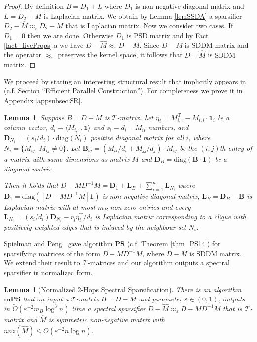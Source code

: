 \documentclass[11pt]{article}
\newcommand{\SDDM}{\mathrm{SDDM}}
\newcommand{\GL}{\mathcal{T}}
\newcommand{\mPS}{\mathrm{\mathbf{mPS}}}
\newcommand{\PS}{\mathbf{PS}}
\newcommand{\wO}{\widetilde{O}}
\newcommand{\hM}{\widehat{M}}
\newcommand{\Di}{D^{-1}}
\newcommand{\mD}{\mathbf{D}}
\newcommand{\mL}{\mathbf{L}}
\newcommand{\mB}{\mathbf{B}}
\newcommand{\diag}{\mathrm{diag}}
\newcommand{\rot}{\mathrm{T}}
\newcommand{\eps}{\epsilon}
\renewcommand{\leq}{\leqslant}
\renewcommand{\eps}{\varepsilon}
\newcommand{\mylemma}[2]{\begin{lem}\label{lem:#1}#2\end{lem}}
\newtheorem{lem}[thm]{Lemma}
\numberwithin{thm}{section}
\begin{document}
\begin{proof}
By definition $B=D_{1}+L$ where $D_{1}$ is non-negative diagonal matrix and $L=D_{2}-M$ is Laplacian matrix. We obtain by Lemma \ref{lemSSDA} a sparsifier $D_{2}-\hM\approx_{\eps}D_{2}-M$ that is Laplacian matrix. Now we consider two cases. If $D_1=0$ then we are done. Otherwise $D_1$ is PSD matrix and by Fact \ref{fact_fiveProps}.a we have $D-\hM\approx_{\eps}D-M$. Since $D-M$ is $\SDDM$ matrix and the operator $\approx_{\eps}$ preserves the kernel space, it follows that $D-\hM$ is $\SDDM$ matrix.
\end{proof}


We proceed by stating an interesting structural result that implicitly appears in~\cite{PS14} (c.f. Section ``Efficient
Parallel Construction''). For completeness we prove it in Appendix \ref{appsubsec:SR}.


\newcommand{\lemGLStruct}
{
Suppose $B=D-M$ is $\GL$-matrix. Let
$\eta_{i}=M_{i,:}^{\rot}-M_{i,i}\cdot\mathbf{1}_{i}$ be a column vector,
$d_{i}=\langle M_{i,:},\mathbf{1}\rangle $ and $s_{i}=d_{i}-M_{ii}$
numbers, and $\mD_{N_i}=(s_{i}/d_{i})\cdot\diag(N_i)$
positive diagonal matrix for all $i$, where $N_i=\{ M_{ij}\,|\, M_{ij}\neq0\}$. Let $\mB_{ij}=(M_{ii}/d_{i}+M_{jj}/d_{j})\cdot M_{ij}$ be the $(i,j)$th entry of a matrix with same dimensions as matrix $M$ and $\mD_{B}=\mathrm{diag(\mB\cdot\mathbf{1})}$ be a diagonal matrix.

Then it holds that
$D-M\Di M = \mD_{1}+\mL_{B}+{\sum}_{i=1}^{n}\mL_{N_i}$ where $\mD_{1}=\diag([D-M\Di M]\mathbf{1})$ is non-negative diagonal matrix, $\mL_{B}=\mD_{B}-\mB$ is Laplacian matrix with
at most $m_B$ non-zero entries and every $\mL_{N_i}=(s_{i}/d_{i})\mD_{N_i}-\eta_{i}\eta_{i}^{\rot}/d_{i}$ is Laplacian matrix corresponding to a clique with positively weighted edges that is induced by the neighbour set $N_i$.
}
\mylemma{lemGLStruct}{\lemGLStruct}


Spielman and Peng~\cite{PS14} gave algorithm $\PS$ (c.f. Theorem \ref{thm_PS14}) for sparsifying matrices of the form $D-M\Di M$, where $D-M$ is $\SDDM$ matrix. We extend their result to $\GL$-matrices and our algorithm outputs a spectral sparsifier in normalized form.

\begin{lem}[Normalized 2-Hops Spectral Sparsification]\label{lemmPS}
There is an algorithm $\mPS$ that on input a $\GL$-matrix $B=D-M$ and parameter $\eps\in(0,1)$, outputs in $\wO(\eps^{-2}m_{B}\log^{3}n)$ time a spectral sparsifier $D-\hM \approx_{\eps}D-M\Di M$ that is $\GL$-matrix and $\hM$ is symmetric non-negative matrix with $nnz(\hM )\leq O(\eps^{-2}n\log n)$.
\end{lem}
\end{document}
